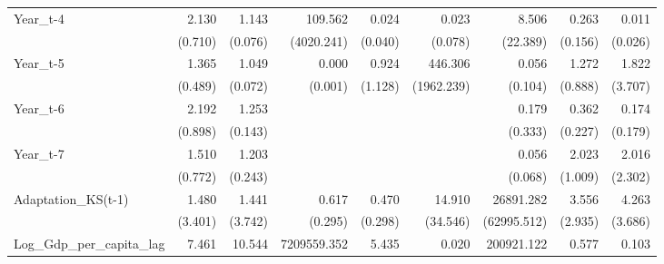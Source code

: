\begin{table}[htbp]
\begin{tabular}{l*{8}{D{.}{.}{-1}}}
Year\_t-4            &       2.130\sym{**} &       1.143\sym{**} &     109.562         &       0.024\sym{**} &       0.023         &       8.506         &       0.263\sym{**} &       0.011\sym{*}  \\
                    &     (0.710)         &     (0.076)         &  (4020.241)         &     (0.040)         &     (0.078)         &    (22.389)         &     (0.156)         &     (0.026)         \\
Year\_t-5            &       1.365         &       1.049         &       0.000         &       0.924         &     446.306         &       0.056\sym{\%}  &       1.272         &       1.822         \\
                    &     (0.489)         &     (0.072)         &     (0.001)         &     (1.128)         &  (1962.239)         &     (0.104)         &     (0.888)         &     (3.707)         \\
Year\_t-6            &       2.192\sym{*}  &       1.253\sym{**} &                     &                     &                     &       0.179         &       0.362\sym{\%}  &       0.174\sym{*}  \\
                    &     (0.898)         &     (0.143)         &                     &                     &                     &     (0.333)         &     (0.227)         &     (0.179)         \\
Year\_t-7            &       1.510         &       1.203         &                     &                     &                     &       0.056\sym{**} &       2.023         &       2.016         \\
                    &     (0.772)         &     (0.243)         &                     &                     &                     &     (0.068)         &     (1.009)         &     (2.302)         \\
Adaptation\_KS(t-1)  &       1.480         &       1.441         &       0.617         &       0.470         &      14.910         &   26891.282\sym{***}&       3.556\sym{\%}  &       4.263\sym{*}  \\
                    &     (3.401)         &     (3.742)         &     (0.295)         &     (0.298)         &    (34.546)         & (62995.512)         &     (2.935)         &     (3.686)         \\
Log\_Gdp\_per\_capita\_lag&       7.461         &      10.544         & 7209559.352\sym{***}&       5.435         &       0.020         &  200921.122         &       0.577         &       0.103         \\

\end{tabular}
\end{table}
